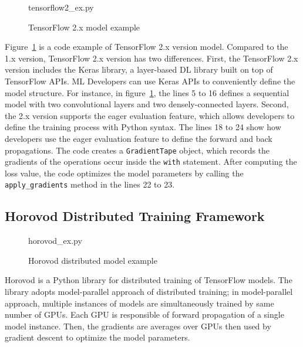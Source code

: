 \begin{figure}[ht!]

{tensorflow2_ex.py}
  \caption{TensorFlow 2.x model example}
\label{fig:back:tf2}
\end{figure}

Figure~\ref{fig:back:tf2} is a code example of TensorFlow 2.x version model.
Compared to the 1.x version, TensorFlow 2.x version has two differences.
First, the TensorFlow 2.x version includes the Keras library, a layer-based
DL library built on top of TensorFlow APIs.
ML Developers can use Keras APIs to conveniently define the model structure.
For instance, in figure~\ref{fig:back:tf2},
the lines 5 to 16 defines a sequential model with two convolutional layers and
two densely-connected layers.
Second, the 2.x version supports the eager evaluation feature, which allows
developers to define the training process with Python syntax.
The lines 18 to 24 show how developers use the eager evaluation feature
to define the forward and back propagations. 
The code creates a {\tt GradientTape} object, which records the gradients
of the operations occur inside the {\tt with} statement.
After computing the loss value,
the code optimizes the model parameters by calling the 
{\tt apply\_gradients} method in the lines 22 to 23.
\subsection{Horovod Distributed Training Framework}

\begin{figure}
 
{horovod_ex.py}
  \caption{Horovod distributed model example}
\label{fig:back:hvd} 
\end{figure}

Horovod is a Python library for distributed training of TensorFlow models.
The library adopts model-parallel approach of distributed training;
in model-parallel approach, multiple instances of models are simultaneously
trained by same number of GPUs.
Each GPU is responsible of forward propagation of a single model instance.
Then, the gradients are averages over GPUs then used by gradient descent
to optimize the model parameters. 

